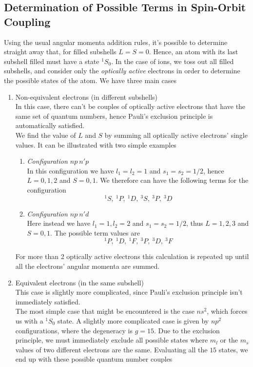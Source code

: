 \documentclass[../qm.tex]{subfiles}
\begin{document}
	\subsection{Determination of Possible Terms in Spin-Orbit Coupling}
	Using the usual angular momenta addition rules, it's possible to determine straight away that, for filled subshells $L=S=0$. Hence, an atom with its last subshell filled must have a state $^1S_0$. In the case of ions, we toss out all filled subshells, and consider only the \textit{optically active} electrons in order to determine the possible states of the atom. We have three main cases\\
	\begin{enumerate}
	\item Non-equivalent electrons (in different subshells)\\
		In this case, there can't be couples of optically active electrons that have the same set of quantum numbers, hence Pauli's exclusion principle is automatically satisfied.\\
		We find the value of $L$ and $S$ by summing all optically active electrons' single values. It can be illustrated with two simple examples
		\begin{enumerate}
		\item \textit{Configuration $np\ n'p$}\\
			In this configuration we have $l_1=l_2=1$ and $s_1=s_2=1/2$, hence $L=0,1,2$ and $S=0,1$. We therefore can have the following terms for the configuration
			\begin{equation*}
				^1S,\ ^1P,\ ^1D,\ ^3S,\ ^3P,\ ^3D
			\end{equation*}
		\item \textit{Configuration $np\ n'd$}\\
			Here instead we have $l_1=1,l_2=2$ and $s_1=s_2=1/2$, thus $L=1,2,3$ and $S=0,1$. The possible term values are
			\begin{equation*}
				^1P,\ ^1D,\ ^1F,\ ^3P,\ ^3D,\ ^3F
			\end{equation*}
		\end{enumerate}
		For more than 2 optically active electrons this calculation is repeated up until all the electrons' angular momenta are summed.
	\item Equivalent electrons (in the same subshell)\\
		This case is slightly more complicated, since Pauli's exclusion principle isn't immediately satisfied.\\
		The most simple case that might be encountered is the case $ns^2$, which forces us with a $^1S_0$ state. A slightly more complicated case is given by $np^2$ configurations, where the degeneracy is $g=15$. Due to the exclusion principle, we must immediately exclude all possible states where $m_l$ or the $m_s$ values of two different electrons are the same. Evaluating all the $15$ states, we end up with these possible quantum number couples

\end{enumerate}
\end{document}

